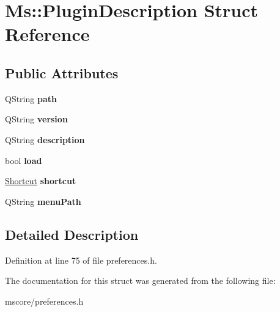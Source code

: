 \hypertarget{struct_ms_1_1_plugin_description}{}\section{Ms\+:\+:Plugin\+Description Struct Reference}
\label{struct_ms_1_1_plugin_description}
\subsection*{Public Attributes}
\begin{DoxyCompactItemize}
\item 
\mbox{\label{struct_ms_1_1_plugin_description_a2ed9b559a5077085de46423cbc53895f}} 
Q\+String {\bfseries path}
\item 
\mbox{\label{struct_ms_1_1_plugin_description_ad9a600647026fcc9d6324b7b8c2ccff2}} 
Q\+String {\bfseries version}
\item 
\mbox{\label{struct_ms_1_1_plugin_description_a1545c2628cc191603dfb29095c9a9f8c}} 
Q\+String {\bfseries description}
\item 
\mbox{\label{struct_ms_1_1_plugin_description_a9603c27476010647bb558f3c32d3bc10}} 
bool {\bfseries load}
\item 
\mbox{\label{struct_ms_1_1_plugin_description_a319da4d412c3aa17135e1f079d990493}} 
\hyperlink{class_ms_1_1_shortcut}{Shortcut} {\bfseries shortcut}
\item 
\mbox{\label{struct_ms_1_1_plugin_description_a1ee1baf557e7ce648a3cc1fdc3efe4c9}} 
Q\+String {\bfseries menu\+Path}
\end{DoxyCompactItemize}


\subsection{Detailed Description}


Definition at line 75 of file preferences.\+h.



The documentation for this struct was generated from the following file\+:\begin{DoxyCompactItemize}
\item 
mscore/preferences.\+h\end{DoxyCompactItemize}
